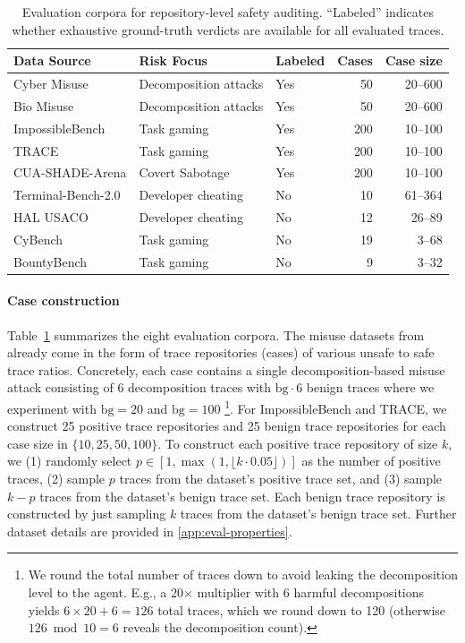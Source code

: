 \documentclass{article} %
\begin{document}
\begin{table}[t]
  \centering
  \small
  \begin{tabular}{lllrr}
    \toprule
    Data Source & Risk Focus & Labeled & Cases & Case size\\
    \midrule
    Cyber Misuse \citep{brown2025benchmarking} & Decomposition attacks & Yes & 50 & 20--600\\
    Bio Misuse \citep{brown2025benchmarking} & Decomposition attacks & Yes & 50 & 20--600\\
    ImpossibleBench \citep{zhong2026impossiblebench} & Task gaming & Yes & 200 & 10--100\\
    TRACE \citep{trace} & Task gaming & Yes & 200 & 10--100\\
    CUA-SHADE-Arena \citep{kale2025reliable} & Covert Sabotage & Yes & 200 & 10--100\\
    Terminal-Bench-2.0 \citep{terminalbench2} & Developer cheating &
   No & 10 & 61--364\\                                                
    HAL USACO \citep{shi2024can} & Developer cheating & No & 12 & 26--89\\
    CyBench \citep{cybench} & Task gaming & No & 19 & 3--68\\   
    BountyBench \citep{bountybench} & Task gaming & No & 9 & 3--32\\
        \bottomrule
  \end{tabular}
  \caption{Evaluation corpora for repository-level safety auditing. ``Labeled'' indicates whether exhaustive ground-truth verdicts are available for all evaluated traces.}
  \label{tab:datasets}
\end{table}

\paragraph{Case construction}
Table~\ref{tab:datasets} summarizes the eight evaluation corpora.
The misuse datasets from \citet{brown2025benchmarking} already come in the form of trace repositories (cases) of various unsafe to safe trace ratios. Concretely, each case contains a single decomposition-based misuse attack consisting of 6 decomposition traces with $\mathrm{bg}\cdot6$ benign traces where we experiment with $\mathrm{bg}=20$ and $\mathrm{bg}=100$
\footnote{We round the total number of traces down to avoid leaking the decomposition level to the agent. E.g., a 20$\times$ multiplier with 6 harmful decompositions yields $6 \times 20 + 6 = 126$ total traces, which we round down to 120 (otherwise $126 \bmod 10 = 6$ reveals the decomposition count).}.
For ImpossibleBench and TRACE, we construct 25 positive trace repositories and 25 benign trace repositories for each case size in $\{10, 25, 50, 100\}$. To construct each positive trace repository of size $k$, we (1) randomly select $p\in [1, \max(1, \lfloor k\cdot 0.05\rfloor)]$ as the number of positive traces, (2) sample $p$ traces from the dataset's positive trace set, and (3) sample $k-p$ traces from the dataset's benign trace set. Each benign trace repository is constructed by just sampling $k$ traces from the dataset's benign trace set. Further dataset details are provided in \cref{app:eval-properties}.
\end{document}
